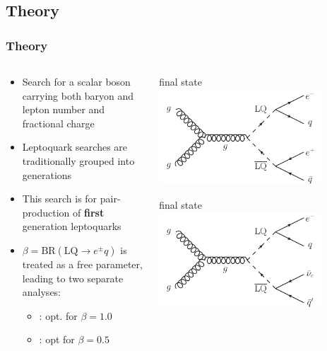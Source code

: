 \documentclass[bigger]{beamer}
\providecommand{\alert}[1]{\textbf{#1}}
\begin{document}
\subsection{Theory}
\label{sec-1-2}
\begin{frame}
\frametitle{Theory}
\label{sec-1-2-1}
\begin{columns}
\begin{column}{0.6\textwidth}
\label{sec-1-2-1-1}

\footnotesize
\begin{itemize}
\item Search for a scalar boson carrying both baryon and lepton number and fractional charge
\item Leptoquark searches are traditionally grouped into generations
\item This search is for pair-production of \alert{first} generation leptoquarks
\item $\beta = \text{BR}(\text{LQ} \rightarrow e^{\pm}q)$ is treated as a free parameter,
leading to two separate analyses:
\begin{itemize}
\item \eejj: opt. for $\beta = 1.0$
\item \enujj: opt for $\beta = 0.5$
\end{itemize}
\end{itemize}
\normalsize
\end{column}
\begin{column}{0.5\textwidth}
\label{sec-1-2-1-2}
\label{sec-1-2-1-2-1}

\centering
\eejj final state
\includegraphics[width=0.8\textwidth]{fig/feynman/LQ_pair_decay_eejj.pdf}
\label{sec-1-2-1-2-2}

\centering
\enujj final state
\includegraphics[width=0.8\textwidth]{fig/feynman/LQ_pair_decay_enujj.pdf}
\end{column}
\end{columns}
\end{frame}
\end{document}
